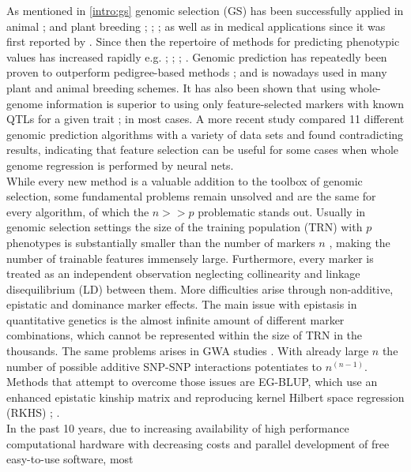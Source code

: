 As mentioned in \ref{intro:gs} genomic selection (GS) has been successfully applied in
animal \cite{hayes2010genome}; \cite{gianola2015one} and plant breeding \cite{crossa2010};
\cite{heffner2010plant}; \cite{desta2014genomic}; \cite{crossa2017} as well as in medical
applications since it was first reported by \cite{hayes2001}. Since then the repertoire of
methods for predicting phenotypic values has increased rapidly e.g. \cite{dlc2009};
\cite{habier2011}; \cite{gianola2013}; \cite{crossa2017}. Genomic prediction has
repeatedly been proven to outperform pedigree-based methods \cite{crossa2010};
\cite{albrecht2011} and is nowadays used in many plant and animal breeding schemes. It has
also been shown that using whole-genome information is superior to using only
feature-selected markers with known QTLs for a given trait \cite{bernardo2007};
\cite{heffner2011} in most cases. A more recent study \cite{azodi2019} compared 11
different genomic prediction algorithms with a variety of data sets and found
contradicting results, indicating that feature selection can be useful for some cases
when whole genome regression is performed by neural nets. \\
While every new method is a valuable addition to the toolbox of genomic selection, some
fundamental problems remain unsolved and are the same for every algorithm, of which the
$n>>p$ problematic stands out. Usually in genomic selection settings the size of the
training population (TRN) with $p$ phenotypes is substantially smaller than the number of
markers $n$ \cite{fan2014challenges}, making the number of trainable features immensely
large. Furthermore, every marker is treated as an independent observation neglecting
collinearity and linkage disequilibrium (LD) between them. More difficulties arise through
non-additive, epistatic and dominance marker effects. The main issue with epistasis in
quantitative genetics is the almost infinite amount of different marker combinations,
which cannot be represented within the size of TRN in the thousands. The same problems
arises in GWA studies \cite{korte2013advantages}. With already large $n$ the number of
possible additive SNP-SNP interactions potentiates to $n^{(n-1)}$. Methods that attempt to
overcome those issues are EG-BLUP, which use an enhanced epistatic kinship matrix and
reproducing kernel Hilbert space regression (RKHS) \cite{jiang2015}; \cite{martini2017genomic}. \\
In the past 10 years, due to increasing availability of high performance computational
hardware with decreasing costs and parallel development of free easy-to-use software, most
